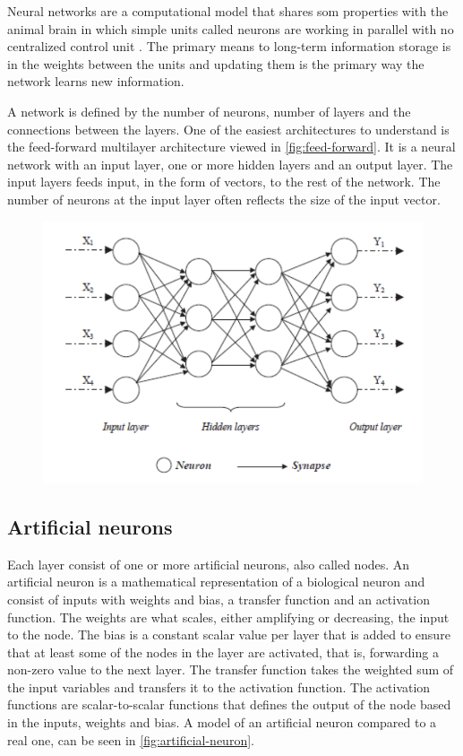 Neural networks are a computational model that shares som properties with the animal brain in which simple units called neurons are working in parallel with no centralized control unit \citet{Patterson2017}. The primary means to long-term information storage is in the weights between the units and updating them is the primary way the network learns new information.

A network is defined by the number of neurons, number of layers and the connections between the layers. One of the easiest architectures to understand is the feed-forward multilayer architecture viewed in \autoref{fig:feed-forward}. It is a neural network with an input layer, one or more hidden layers and an output layer. The input layers feeds input, in the form of vectors, to the rest of the network. The number of neurons at the input layer often reflects the size of the input vector.

\begin{figure}[H]
	\centering
	\includegraphics[width=0.8\linewidth]{fig/feedforward-neural-network.png}
	\label{fig:feed-forward}
\end{figure}

\subsection{Artificial neurons}
Each layer consist of one or more artificial neurons, also called nodes. An artificial neuron is a mathematical representation of a biological neuron and consist of inputs with weights and bias, a transfer function and an activation function. The weights are what scales, either amplifying or decreasing, the input to the node. The bias is a constant scalar value per layer that is added to ensure that at least some of the nodes in the layer are activated, that is, forwarding a non-zero value to the next layer. The transfer function takes the weighted sum of the input variables and transfers it to the activation function. The activation functions are scalar-to-scalar functions that defines the output of the node based in the inputs, weights and bias. A model of an artificial neuron compared to a real one, can be seen in \autoref{fig:artificial-neuron}. 


